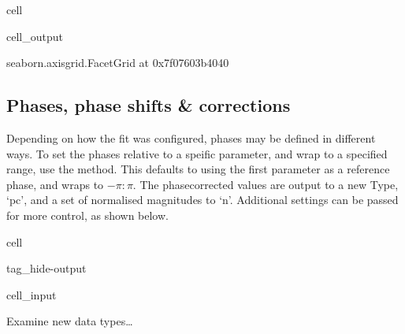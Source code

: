 \documentclass[letterpaper,table,10pt,english]{jupyterBook}
\begin{document}
\begin{sphinxuseclass}{cell}
\begin{sphinxVerbatimOutput}
\begin{sphinxuseclass}{cell_output}
\begin{sphinxVerbatim}[commandchars=\\\{\}]
\PYGZlt{}seaborn.axisgrid.FacetGrid at 0x7f07603b4040\PYGZgt{}
\end{sphinxVerbatim}

\noindent{}

\end{sphinxuseclass}\end{sphinxVerbatimOutput}

\end{sphinxuseclass}

\subsection{Phases, phase shifts \& corrections}
\label{\detokenize{part2/case-study-C2H4_290723:phases-phase-shifts-corrections}}
\sphinxAtStartPar
Depending on how the fit was configured, phases may be defined in different ways. To set the phases relative to a speific parameter, and wrap to a specified range, use the  method. This defaults to using the first parameter as a reference phase, and wraps to \(-\pi:\pi\). The phase\sphinxhyphen{}corrected values are output to a new Type, ‘pc’, and a set of normalised magnitudes to ‘n’. Additional settings can be passed for more control, as shown below.

\begin{sphinxuseclass}{cell}
\begin{sphinxuseclass}{tag_hide-output}\begin{sphinxVerbatimInput}

\begin{sphinxuseclass}{cell_input}
\begin{sphinxVerbatim}[commandchars=\\\{\}]
 
\end{sphinxVerbatim}

\end{sphinxuseclass}\end{sphinxVerbatimInput}

\end{sphinxuseclass}
\end{sphinxuseclass}
\sphinxAtStartPar
Examine new data types…
\end{document}
